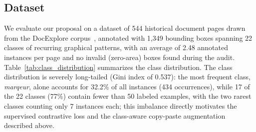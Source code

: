 \documentclass{iopjournal}
\begin{document}
\subsection{Dataset}
 
We evaluate our proposal on a dataset of 544 historical document pages drawn from the DocExplore corpus~\cite{en2017dataset}, annotated with 1{,}349 bounding boxes spanning 22 classes of recurring graphical patterns, with an average of 2.48 annotated instances per page and no invalid (zero-area) boxes found during the audit. Table~\ref{tab:class_distribution} summarizes the class distribution. The class distribution is severely long-tailed (Gini index of 0.537): the most frequent class, \textit{marqeur}, alone accounts for 32.2\% of all instances (434 occurrences), while 17 of the 22 classes (77\%) contain fewer than 50 labeled examples, with the two rarest classes counting only 7 instances each; this imbalance directly motivates the supervised contrastive loss and the class-aware copy-paste augmentation described above.
 
\end{document}
